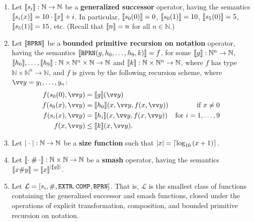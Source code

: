 \begin{definition} \cite{cobham-1965}

\begin{enumerate}[label=(\arabic*)]

\item Let $\sem{s_i} : \mathbb{N} \rightarrow \mathbb{N}$ be a
\textbf{generalized successor} operator, having the semantics $\sem{s_i\p{x}} =
10 \cdot \sem{x} + i$. In particular, $\sem{s_0\p{0}} = 0$, $\sem{s_0\p{1}} =
10$, $\sem{s_5\p{0}} = 5$, $\sem{s_5\p{1}} = 15$, etc. (Recall that $\sem{n} =
n$ for all $n \in \mathbb{N}$.)

\item Let $\sem{\mathtt{BPRN}}$ be a \textbf{bounded primitive recursion on
notation} operator, having the semantics
$\sem{\mathtt{BPRN}\p{g,h_0,\ldots,h_9,k}} = f$, for some $\sem{g} :
\mathbb{N}^n \rightarrow \mathbb{N}$, $\sem{h_0}, \ldots, \sem{h_9} :
\mathbb{N} \times \mathbb{N}^n \times \mathbb{N} \rightarrow \mathbb{N}$ and
$\sem{k} : \mathbb{N} \times \mathbb{N}^n \rightarrow \mathbb{N}$, where $f$
has type $\mathbb{N} \times \mathbb{N}^n \rightarrow \mathbb{N}$, and $f$ is
given by the following recursion scheme, where $\vect{y} =
y_1,\ldots,y_n$:\begin{align*}
%
f\p{s_0\p{0}, \vect{y}} &= \sem{g}\p{\vect{y}} \\
%
f\p{s_0\p{x}, \vect{y}} &= \sem{h_0}\p{x, \vect{y}, f\p{x, \vect{y}}} &
\text{if $x\neq 0$}\\
%
f\p{s_i\p{x}, \vect{y}} &= \sem{h_i}\p{x, \vect{y}, f\p{x, \vect{y}}} &
\text{for $i=1,\ldots,9$} \\
%
f\p{x, \vect{y}} &\leq \sem{k}\p{x, \vect{y}}.
%
\end{align*}

\item Let $\card{\mathrel{}\cdotnot\mathrel{}} : \mathbb{N} \rightarrow
\mathbb{N}$ be a \textbf{size function} such that $\card{x} =
\ceil{\log_{10}\p{x+1}}$.

\item Let $\sem{\cdotnot \; \smashf{} \; \cdotnot} : \mathbb{N} \times
\mathbb{N} \rightarrow \mathbb{N}$ be a \textbf{smash} operator, having the
semantics $\sem{x \smashf{} y} = \sem{x}^\card{\sem{y}}$.

\item Let $\mathcal{L} = \seq{s_i, \smashf{}, \mathtt{EXTR}, \mathtt{COMP},
\mathtt{BPRN}}$. That is, $\mathcal{L}$ is the smallest class of functions
containing the generalized successor and smash functions, closed under the
operations of explicit transformation, composition, and bounded primitive
recursion on notation.
 
\end{enumerate}

\end{definition}

